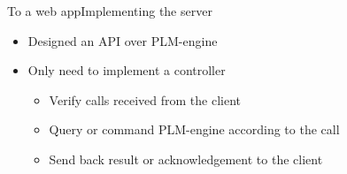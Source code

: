 \documentclass{beamer}
\begin{document}
\begin{frame}{To a web app}{Implementing the server}
  \begin{itemize}
  \item {
    Designed an API over PLM-engine
  }
  \item {
    Only need to implement a controller
    \begin{itemize}
    \item Verify calls received from the client
    \item Query or command PLM-engine according to the call
    \item Send back result or acknowledgement to the client
    \end{itemize}
  }
  \end{itemize}
\end{frame}
\end{document}
